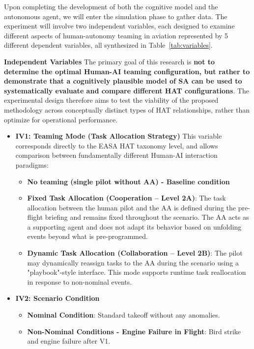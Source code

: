 \documentclass[12pt,a4paper]{article} %
\begin{document}
	Upon completing the development of both the cognitive model and the autonomous agent, we will enter the simulation phase to gather data. The experiment will involve two independent variables, each designed to examine different aspects of human-autonomy teaming in aviation represented by 5 different dependent variables, all synthesized in Table~\ref{tab:variables}.
	
	\textbf{Independent Variables}
	The primary goal of this research is \textbf{not to determine the optimal Human-AI teaming configuration, but rather to demonstrate that a cognitively plausible model of SA can be used to systematically evaluate and compare different HAT configurations}. The experimental design therefore aims to test the viability of the proposed methodology across conceptually distinct types of HAT relationships, rather than optimize for operational performance.

	\begin{itemize}
	\item \textbf{IV1: Teaming Mode (Task Allocation Strategy)}
	This variable corresponds directly to the EASA HAT taxonomy level, and allows comparison between fundamentally different Human-AI interaction paradigms:

	\begin{itemize}
	\item \textbf{No teaming (single pilot without AA) - Baseline condition}
	\item \textbf{Fixed Task Allocation (Cooperation – Level 2A)}:  
	The task allocation between the human pilot and the AA is defined during the pre-flight briefing and remains fixed throughout the scenario. The AA acts as a supporting agent and does not adapt its behavior based on unfolding events beyond what is pre-programmed.

	\item \textbf{Dynamic Task Allocation (Collaboration – Level 2B)}:  
	The pilot may dynamically reassign tasks to the AA during the scenario using a "playbook"-style interface. This mode supports runtime task reallocation in response to non-nominal events.
	\end{itemize}

	\item \textbf{IV2: Scenario Condition}
	\begin{itemize}
	\item \textbf{Nominal Condition}:  
	Standard takeoff without any anomalies.
	\item \textbf{Non-Nominal Conditions - Engine Failure in Flight}: Bird strike and engine failure after V1.
	\end{itemize}
	\end{itemize}
\end{document}
